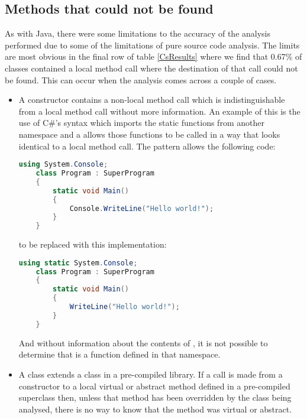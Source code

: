 \subsection{Methods that could not be found}
As with Java, there were some limitations to the accuracy of the analysis performed due to some of the limitations of pure source code analysis. The limits are most obvious in the final row of table \ref{CsResults} where we find that 0.67\% of classes contained a local method call where the destination of that call could not be found. This can occur when the analysis comes across a couple of cases.
\begin{itemize}
	\item A constructor contains a non-local method call which is indistinguishable from a local method call without more information. An example of this is the use of C\#'s  syntax which imports the static functions from another namespace and a allows those functions to be called in a way that looks identical to a local method call. The  pattern allows the following code:
	\begin{lstlisting}[language=cs]
	using System.Console;
	class Program : SuperProgram
	{ 
		static void Main() 
		{ 
			Console.WriteLine("Hello world!"); 
		} 
	}
	\end{lstlisting}
	to be replaced with this implementation:
	\begin{lstlisting}[language=cs]
	using static System.Console;
	class Program : SuperProgram
	{ 
		static void Main() 
		{ 
			WriteLine("Hello world!"); 
		} 
	}
	\end{lstlisting}
	And without information about the contents of , it is not possible to determine that  is a function defined in that namespace.
	\item A class extends a class in a pre-compiled library. If a call is made from a constructor to a local virtual or abstract method defined in a pre-compiled superclass then, unless that method has been overridden by the class being analysed, there is no way to know that the method was virtual or abstract.
\end{itemize}


